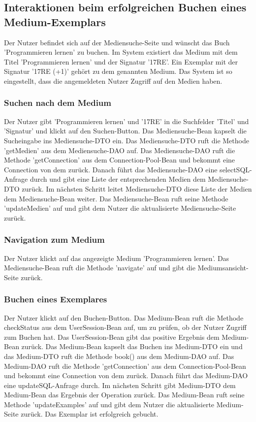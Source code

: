 \documentclass{article}
\begin{document}
\subsection{Interaktionen beim erfolgreichen Buchen eines Medium-Exemplars}
Der Nutzer befindet sich auf der Mediensuche-Seite und wünscht das Buch 'Programmieren lernen' zu buchen. Im System existiert das Medium mit dem Titel 'Programmieren lernen' und der Signatur '17RE'. Ein Exemplar mit der Signatur '17RE (+1)' gehört zu dem genannten Medium. Das System ist so eingestellt, dass die angemeldeten Nutzer Zugriff auf den Medien haben.
\subsubsection{Suchen nach dem Medium}
Der Nutzer gibt 'Programmieren lernen' und '17RE' in die Suchfelder 'Titel' und 'Signatur' und klickt auf den Suchen-Button. Das Mediensuche-Bean kapselt die Sucheingabe ins Mediensuche-DTO ein. Das Mediensuche-DTO ruft die Methode 'getMedien' aus dem Mediensuche-DAO auf. Das Mediensuche-DAO ruft die Methode 'getConnection' aus dem Connection-Pool-Bean und bekommt eine Connection von dem zurück. Danach führt das Mediensuche-DAO eine selectSQL-Anfrage durch und gibt eine Liste der entsprechenden Medien dem Mediensuche-DTO zurück. Im nächsten Schritt leitet Mediensuche-DTO diese Liste der Medien dem Mediensuche-Bean weiter. Das Mediensuche-Bean ruft seine Methode 'updateMedien' auf und gibt dem Nutzer die aktualisierte Mediensuche-Seite zurück.
\subsubsection{Navigation zum Medium}
Der Nutzer klickt auf das angezeigte Medium 'Programmieren lernen'. Das Mediensuche-Bean ruft die Methode 'navigate' auf und gibt die Mediumsansicht-Seite zurück.
\subsubsection{Buchen eines Exemplares}
Der Nutzer klickt auf den Buchen-Button. Das Medium-Bean ruft die Methode checkStatus aus dem UserSession-Bean auf, um zu prüfen, ob der Nutzer Zugriff zum Buchen hat. Das UserSession-Bean gibt das positive Ergebnis dem Medium-Bean zurück. Das Medium-Bean kapselt das Buchen ins Medium-DTO ein und das Medium-DTO ruft die Methode book() aus dem Medium-DAO auf. Das Medium-DAO ruft die Methode 'getConnection' aus dem Connection-Pool-Bean und bekommt eine Connection von dem zurück. Danach führt das Medium-DAO eine updateSQL-Anfrage durch. Im nächsten Schritt gibt Medium-DTO  dem Medium-Bean das Ergebnis der Operation zurück. Das Medium-Bean ruft seine Methode 'updateExamples' auf und gibt dem Nutzer die aktualisierte Medium-Seite zurück. Das Exemplar ist erfolgreich gebucht.
\end{document}
